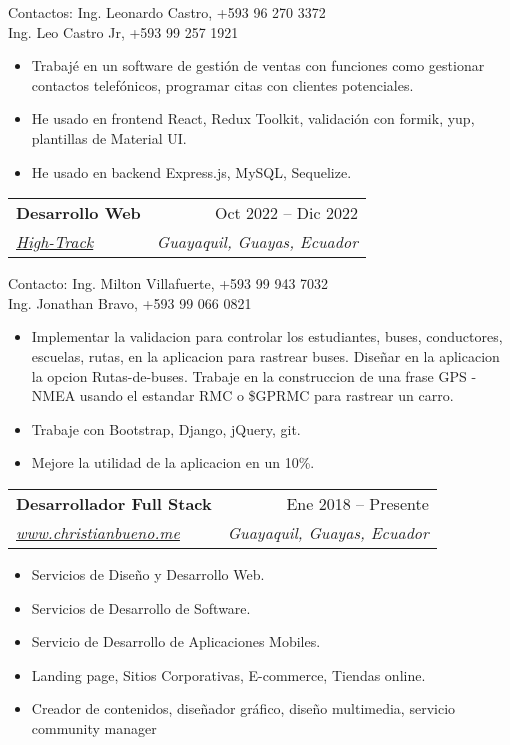 \documentclass[a4paper,11pt]{article}
\makeatletter
\newcommand{\resumeItem}[1]{
  \item\small{#1}
}
\newcommand{\resumeItemListStart}{\begin{itemize}[rightmargin=0.11in]}
\newcommand{\resumeItemListEnd}{\end{itemize}}
\newcommand{\resumeQuadHeading}[4]{
  \item
  \begin{tabular*}{0.96\textwidth}[t]{l@{\extracolsep{\fill}}r}
    \textbf{#1} & #2 \\
    \textit{\small#3} & \textit{\small #4} \\
  \end{tabular*}
}
\makeatother
\begin{document}
  \small {Contactos: Ing. Leonardo Castro, +593 96 270 3372 \\
  Ing. Leo Castro Jr,  +593 99 257 1921 }
    \resumeItemListStart{}
      \resumeItem{
      Trabajé en un software de gestión de ventas con funciones como gestionar contactos telefónicos, programar citas con clientes potenciales.
      }
      \resumeItem{
      He usado en frontend React, Redux Toolkit, validación con formik, yup, plantillas de Material UI.
      }
      \resumeItem{
      He usado en backend Express.js, MySQL, Sequelize.
      }
    \resumeItemListEnd{}

  \resumeQuadHeading{Desarrollo Web}{Oct 2022 -- Dic 2022}
  {\href{https://high-track.com/}{\uline{High-Track}}} {Guayaquil, Guayas, Ecuador}
  \small {Contacto: Ing. Milton Villafuerte, +593 99 943 7032  \\
   Ing. Jonathan Bravo, +593 99 066 0821}
    \resumeItemListStart{}
      \resumeItem{
      Implementar la validacion para controlar los estudiantes, buses, conductores, escuelas, rutas, en la aplicacion para rastrear buses. Diseñar en la aplicacion la opcion Rutas-de-buses. Trabaje en la construccion de una frase GPS - NMEA usando el estandar RMC o \$GPRMC para rastrear un carro.
      }
      \resumeItem{
      Trabaje con Bootstrap, Django, jQuery, git.
      }
      \resumeItem{
      Mejore la utilidad de la aplicacion en un 10\%.
      }
    \resumeItemListEnd{}
    
  \resumeQuadHeading{Desarrollador Full Stack}{Ene 2018 -- Presente}
  {\href{https://christianbueno.me}{\uline{www.christianbueno.me}}}{Guayaquil, Guayas, Ecuador}
    \resumeItemListStart{}
      \resumeItem{Servicios de Diseño y Desarrollo Web.}
      \resumeItem{Servicios de Desarrollo de Software.}
      \resumeItem{Servicio de Desarrollo de Aplicaciones Mobiles.}
      \resumeItem{Landing page, Sitios Corporativas, E-commerce, Tiendas online.}
      \resumeItem{Creador de contenidos, diseñador gráfico, diseño multimedia, servicio community manager}
    \resumeItemListEnd{}
\end{document}
